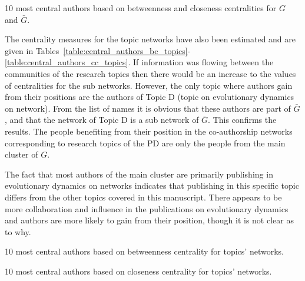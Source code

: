 \begin{table}[!hbtp]
    \begin{center}
    \resizebox{.9\textwidth}{!}{}
\end{center}
\caption{10 most central authors based on betweenness and closeness centralities
for \(G\) and \(\bar{G}\).}\label{table:central_authors}
\end{table}

The centrality measures for the topic networks have also been estimated and are
given in
Tables~\ref{table:central_authors_bc_topics}-\ref{table:central_authors_cc_topics}.
If information was flowing between the communities of the research topics then
there would be an increase to the values of centralities for the sub networks.
However, the only topic where authors gain from their positions are the authors
of Topic D (topic on evolutionary dynamics on network). From the list of names it is obvious that these authors are
part of \(\bar{G}\), and that the network of Topic D is a sub network of \(\bar{G}\).
This confirms the results. The people benefiting from their position in the co-authorship networks
corresponding to research topics of the PD are only the people from the main
cluster of \(G\).

The fact that most authors of the main cluster are primarily publishing in
evolutionary dynamics on networks indicates that publishing in this specific
topic differs from the other topics covered in this manuscript. There appears to
be more collaboration and influence in the publications on evolutionary
dynamics and authors are more likely to gain from their position,
though it is not clear as to why.

\begin{table}[!hbtp]
    \begin{center}
    \resizebox{.9\textwidth}{!}{}
\end{center}
\caption{10 most central authors based on betweenness centrality
for topics' networks.}\label{table:central_authors_bc_topics}
\end{table}

\begin{table}[!hbtp]
    \begin{center}
    \resizebox{.9\textwidth}{!}{}
\end{center}
\caption{10 most central authors based on closeness centrality
for topics' networks.}\label{table:central_authors_cc_topics}
\end{table}


